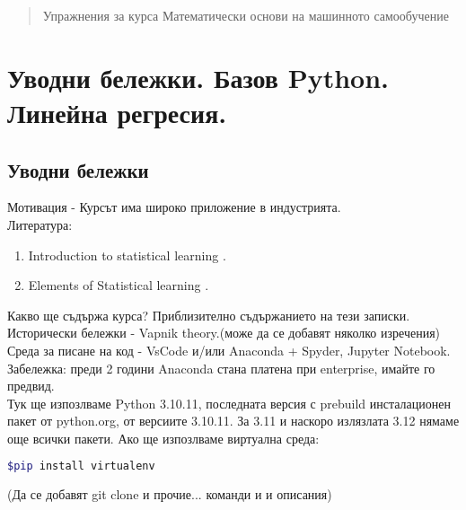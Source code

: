 \documentclass{article}
\begin{document}
	\newpage
	\date{}
	\maketitle

	\begin{abstract}
		Упражнения за курса Математически основи на машинното самообучение
	\end{abstract}
	
	\tableofcontents
		


	\section{Уводни бележки. Базов Python. Линейна регресия.}
	\subsection{Уводни бележки}
	Мотивация - Курсът има широко приложение в индустрията.\\	
	Литература:
	\begin{enumerate}
	\item  Introduction to statistical learning \cite{james2023introduction}.
	\item  Elements of Statistical learning  \cite{hastie01statisticallearning}.
	\end{enumerate}
	
	\noindent
	Какво ще съдържа курса? Приблизително съдържанието на тези записки. \\
	
	\noindent
	Исторически бележки - Vapnik theory.(може да се добавят няколко изречения) \\

	\noindent	
	Среда за писане на код - VsCode и/или Anaconda + Spyder, Jupyter Notebook. \\
 	Забележка: преди 2 години Anaconda стана платена при enterprise, имайте го предвид.\\
 	Тук ще изпозлваме Python 3.10.11, последната версия с prebuild инсталационен пакет от python.org,
 	от версиите 3.10.11. За 3.11 и наскоро излязлата 3.12 нямаме още всички пакети. Ако ще изпозлваме виртуална среда: 	
 	\begin{lstlisting}[language=bash]
$pip install virtualenv
 	\end{lstlisting}
 	(Да се добавят git clone и прочие... команди и и описания) \\
 	
\end{document}
